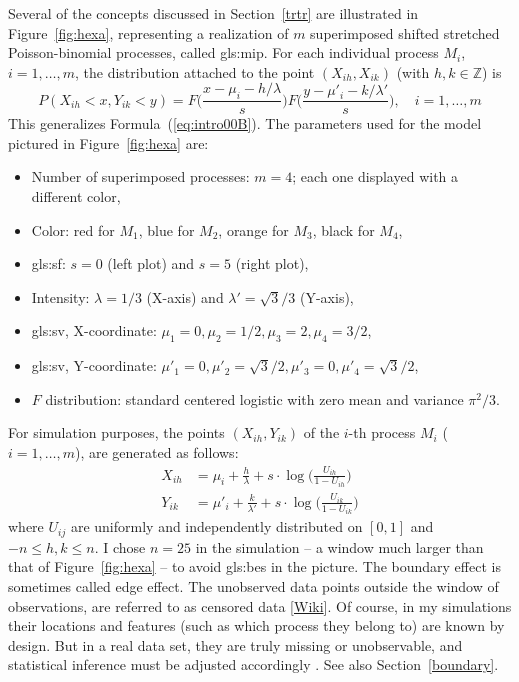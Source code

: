 \documentclass[10pt]{article}
\begin{document}
Several of the concepts discussed in Section~\ref{trtr} are illustrated in Figure~\ref{fig:hexa}, representing a realization of $m$ superimposed shifted stretched Poisson-binomial processes,
 called \gls{gls:mip}. For each individual process $M_i$, $i=1,\dots,m$, the distribution attached to the point $(X_{ih},X_{ik})$ (with $h,k\in \mathbb{Z}$) is
$$
P(X_{ih}<x, Y_{ik}<y) = F\Big(\frac{x-\mu_i -h/\lambda}{s}\Big)F\Big(\frac{y-\mu'_i - k/\lambda'}{s}\Big),  \quad i=1,\dots,m
$$
This generalizes Formula~(\ref{eq:intro00B}). The parameters used for the model pictured in Figure~\ref{fig:hexa} are:
\quad \\
\begin{itemize}
\item Number of superimposed processes: $m=4$; each one displayed with a different color,
\item Color: red for $M_1$, blue for $M_2$, orange for $M_3$, black for $M_4$,
\item \gls{gls:sf}: $s=0$ (left plot) and $s=5$ (right plot),
\item Intensity: $\lambda=1/3$ (X-axis) and $\lambda'=\sqrt{3}/3$ (Y-axis),
\item \Gls{gls:sv}, X-coordinate: $\mu_1=0, \mu_2=1/2, \mu_3=2, \mu_4=3/2 $,
\item \Gls{gls:sv}, Y-coordinate: $\mu'_1=0, \mu'_2=\sqrt{3}/2, \mu'_3=0, \mu'_4=\sqrt{3}/2 $,
\item $F$ distribution: standard centered \textcolor{index}{logistic} with zero mean and variance $\pi^2/3$.
\end{itemize}
For simulation purposes, the points $(X_{ih},Y_{ik})$ of the $i$-th process $M_i$ ($i=1,\dots,m$), are generated as follows:
\begin{align}
X_{ih} & =\mu_i + \frac{h}{\lambda} +s \cdot \log \Big(\frac{U_{ih}}{1-U_{ih}}\Big) \label{simm1}\\
Y_{ik} & =\mu'_i+ \frac{k}{\lambda'} +s \cdot \log\Big(\frac{U_{ik}}{1-U_{ik}}\Big) \label{simm2}
\end{align}
where $U_{ij}$ are uniformly and independently distributed on $[0,1]$ and $-n\leq h,k\leq n$.
I chose $n=25$ in the simulation -- a window much larger than that of Figure~\ref{fig:hexa} -- to avoid
\glspl{gls:be} in the picture. The boundary effect is sometimes called
\textcolor{index}{edge effect}. The unobserved data points outside the
window of observations, are referred to as \textcolor{index}{censored data} [\href{https://en.wikipedia.org/wiki/Censoring_(statistics)}{Wiki}].
Of course, in my simulations their locations and features (such as which process they belong to) are known by design. But in a real data set, they are truly
missing or unobservable, and statistical inference must be adjusted accordingly
\cite{censored}.
See also Section~\ref{boundary}.
\end{document}
